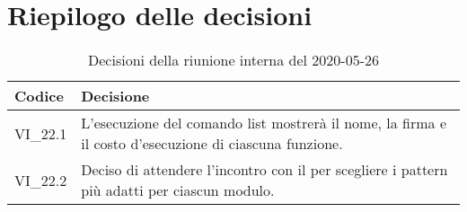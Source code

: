 \section{Riepilogo delle decisioni}
\begin{longtable}{ 
	 >{\centering}p{} >{}p{} }
	
	\caption{Decisioni della riunione interna del 2020-05-26}\\	
	
	\textbf{\color{white}Codice} & 
	\textbf{\color{white}Decisione} 
	\tabularnewline  
	\endhead
	
	VI\_22.1 & L'esecuzione del comando list mostrerà il nome, la firma e il costo d'esecuzione di ciascuna funzione. \\
	VI\_22.2 & Deciso di attendere l'incontro con il \RC{} per scegliere i pattern più adatti per ciascun modulo. \\
\end{longtable}
